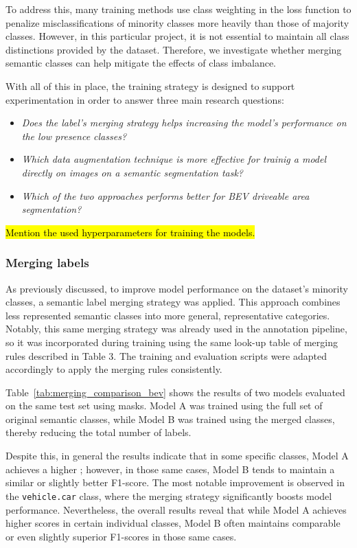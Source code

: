 To address this, many training methods use class weighting in the loss function to penalize misclassifications of minority classes more heavily than those of majority classes. However, in this particular project, it is not essential to maintain all class distinctions provided by the dataset. Therefore, we investigate whether merging semantic classes can help mitigate the effects of class imbalance.

With all of this in place, the training strategy is designed to support experimentation in order to answer three main research questions:

\begin{itemize}
    \item \textit{Does the label's merging strategy helps increasing the model's performance on the low presence classes?}
    \item \textit{Which data augmentation technique is more effective for trainig a model directly on  images on a semantic segmentation task?}
    \item \textit{Which of the two approaches performs better for BEV driveable area segmentation?}
\end{itemize}

\hl{Mention the used hyperparameters for training the models.}

\subsubsection{Merging labels}
As previously discussed, to improve model performance on the dataset’s minority classes, a semantic label merging strategy was applied. This approach combines less represented semantic classes into more general, representative categories. Notably, this same merging strategy was already used in the annotation pipeline, so it was incorporated during training using the same look-up table of merging rules described in Table 3. The training and evaluation scripts were adapted accordingly to apply the merging rules consistently.

Table~\ref{tab:merging_comparison_bev} shows the results of two models evaluated on the same test set using  masks. Model A was trained using the full set of original semantic classes, while Model B was trained using the merged classes, thereby reducing the total number of labels. 

Despite this, in general the results indicate that in some specific classes, Model A achieves a higher ; however, in those same cases, Model B tends to maintain a similar or slightly better F1-score. The most notable improvement is observed in the \texttt{vehicle.car} class, where the merging strategy significantly boosts model performance. Nevertheless, the overall results reveal that while Model A achieves higher  scores in certain individual classes, Model B often maintains comparable or even slightly superior F1-scores in those same cases.

